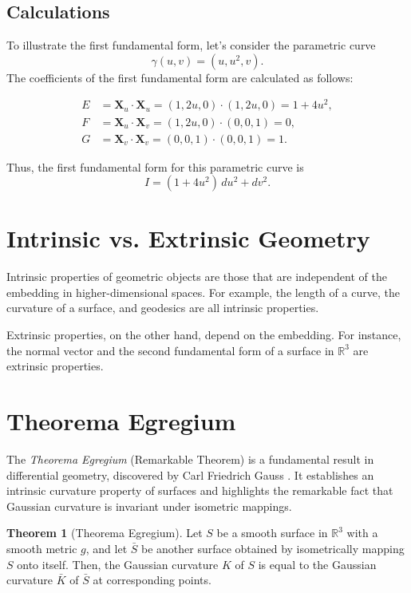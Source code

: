 \documentclass{article}
\theoremstyle{definition}
\newtheorem{theorem}[definition]{Theorem}
\numberwithin{equation}{section}
\begin{document}
\subsection{Calculations}
To illustrate the first fundamental form, let's consider the parametric curve
\[\gamma(u, v) = (u, u^2, v).\]
The coefficients of the first fundamental form are calculated as follows:

\begin{align*}
E &= \mathbf{X}_u \cdot \mathbf{X}_u = (1, 2u, 0) \cdot (1, 2u, 0) = 1 + 4u^2, \\
F &= \mathbf{X}_u \cdot \mathbf{X}_v = (1, 2u, 0) \cdot (0, 0, 1) = 0, \\
G &= \mathbf{X}_v \cdot \mathbf{X}_v = (0, 0, 1) \cdot (0, 0, 1) = 1.
\end{align*}

Thus, the first fundamental form for this parametric curve is
\[I = (1 + 4u^2)\,du^2 + dv^2.\]

\section{Intrinsic vs. Extrinsic Geometry}
Intrinsic properties of geometric objects are those that are independent of the embedding in higher-dimensional spaces. For example, the length of a curve, the curvature of a surface, and geodesics are all intrinsic properties.

Extrinsic properties, on the other hand, depend on the embedding. For instance, the normal vector and the second fundamental form of a surface in $\mathbb{R}^3$ are extrinsic properties.

\section{Theorema Egregium}
The \textit{Theorema Egregium} (Remarkable Theorem) is a fundamental result in differential geometry, discovered by Carl Friedrich Gauss \cite{gauss}. It establishes an intrinsic curvature property of surfaces and highlights the remarkable fact that Gaussian curvature is invariant under isometric mappings.

\begin{theorem}[Theorema Egregium]
Let $S$ be a smooth surface in $\mathbb{R}^3$ with a smooth metric $g$, and let $\bar{S}$ be another surface obtained by isometrically mapping $S$ onto itself. Then, the Gaussian curvature $K$ of $S$ is equal to the Gaussian curvature $\bar{K}$ of $\bar{S}$ at corresponding points.
\end{theorem}
\end{document}
